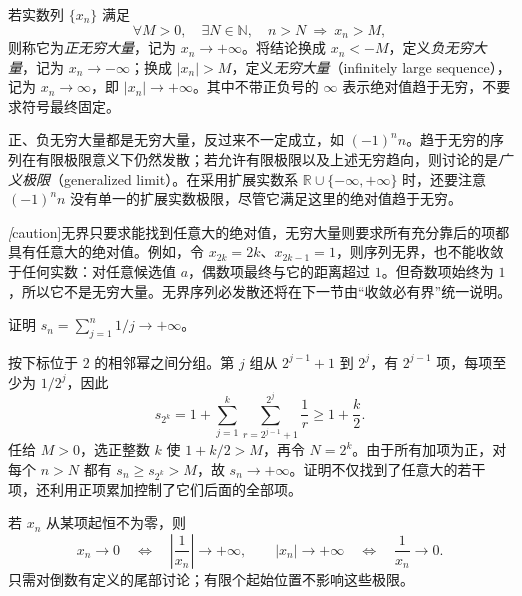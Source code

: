 \documentclass[UTF8,12pt,a4paper,fontset=fandol]{ctexbook}
\begin{document}
\begin{definition}
\label{def:infinite-sequence}
若实数列 $\{x_n\}$ 满足
\begin{equation}
    \forall M>0,\quad\exists N\in\mathbb{N},\quad
    n>N\ \Longrightarrow\ x_n>M,
    \label{eq:positive-infinite-sequence}
\end{equation}
则称它为\emph{正无穷大量}，记为 $x_n\to+\infty$。将结论换成 $x_n<-M$，定义\emph{负无穷大量}，记为 $x_n\to-\infty$；换成 $|x_n|>M$，定义\emph{无穷大量}（infinitely large sequence），记为 $x_n\to\infty$，即 $|x_n|\to+\infty$。其中不带正负号的 $\infty$ 表示绝对值趋于无穷，不要求符号最终固定。
\end{definition}

正、负无穷大量都是无穷大量，反过来不一定成立，如 $(-1)^n n$。趋于无穷的序列在有限极限意义下仍然发散；若允许有限极限以及上述无穷趋向，则讨论的是\emph{广义极限}（generalized limit）。在采用扩展实数系 $\mathbb{R}\cup\{-\infty,+\infty\}$ 时，还要注意 $(-1)^n n$ 没有单一的扩展实数极限，尽管它满足这里的绝对值趋于无穷。

\emph[caution]{无界只要求能找到任意大的绝对值，无穷大量则要求所有充分靠后的项都具有任意大的绝对值。}例如，令 $x_{2k}=2k$、$x_{2k-1}=1$，则序列无界，也不能收敛于任何实数：对任意候选值 $a$，偶数项最终与它的距离超过 $1$。但奇数项始终为 $1$，所以它不是无穷大量。无界序列必发散还将在下一节由“收敛必有界”统一说明。

\begin{example}
\label{ex:harmonic-sequence-positive-infinity}
证明 $s_n=\sum_{j=1}^n1/j\to+\infty$。
\end{example}

\begin{solve}
按下标位于 $2$ 的相邻幂之间分组。第 $j$ 组从 $2^{j-1}+1$ 到 $2^j$，有 $2^{j-1}$ 项，每项至少为 $1/2^j$，因此
\[
    s_{2^k}=1+\sum_{j=1}^k\sum_{r=2^{j-1}+1}^{2^j}\frac1r
    \geq1+\frac{k}{2}.
\]
任给 $M>0$，选正整数 $k$ 使 $1+k/2>M$，再令 $N=2^k$。由于所有加项为正，对每个 $n>N$ 都有 $s_n\geq s_{2^k}>M$，故 $s_n\to+\infty$。证明不仅找到了任意大的若干项，还利用正项累加控制了它们后面的全部项。
\end{solve}

\begin{proposition}[无穷小量与倒数的关系]
\label{prop:infinitesimal-sequence-reciprocal}
若 $x_n$ 从某项起恒不为零，则
\begin{equation}
    x_n\to0\quad\Longleftrightarrow\quad
    \left|\frac1{x_n}\right|\to+\infty,
    \qquad
    |x_n|\to+\infty\quad\Longleftrightarrow\quad\frac1{x_n}\to0.
    \label{eq:sequence-infinitesimal-reciprocal}
\end{equation}
只需对倒数有定义的尾部讨论；有限个起始位置不影响这些极限。
\end{proposition}
\end{document}
